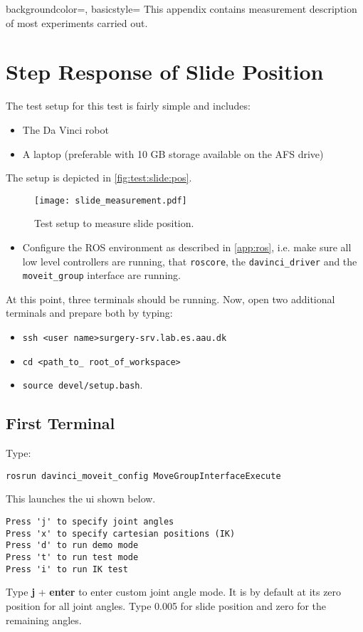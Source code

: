 {
    backgroundcolor=\color{black},
    basicstyle=\scriptsize\color{green}\ttfamily
}
This appendix contains measurement description of most experiments carried out.
\section{Step Response of Slide Position}
The test setup for this test is fairly simple and includes:
\begin{itemize}
\item The Da Vinci robot
\item A laptop (preferable with 10 GB storage available on the AFS drive)
\end{itemize}
The setup is depicted in \autoref{fig:test:slide:pos}.
\begin{figure}[H]\hspace{-1.4cm}
\texttt{[image: slide\_measurement.pdf]}
\caption{Test setup to measure slide position.}
\label{fig:test:slide:pos}
\end{figure}
\begin{itemize}
\item Configure the ROS environment as described in \autoref{app:ros}, i.e. make sure all low level controllers are running, that \texttt{roscore}, the \texttt{davinci\_driver} and the \texttt{moveit\_group} interface are running.
\end{itemize}
At this point, three terminals should be running. Now, open two additional terminals and prepare both by typing:
\begin{itemize}
\item \texttt{ssh <user name>surgery-srv.lab.es.aau.dk} 
\item \texttt{cd <path\_to\_ root\_of\_workspace>}
\item \texttt{source devel/setup.bash}.
\end{itemize}
\subsection*{First Terminal}
Type:

\hspace{1cm} \texttt{rosrun davinci\_moveit\_config MoveGroupInterfaceExecute}

This launches the \gls{ui} shown below.
\begin{lstlisting}[style=DOS]
Press 'j' to specify joint angles
Press 'x' to specify cartesian positions (IK)
Press 'd' to run demo mode
Press 't' to run test mode
Press 'i' to run IK test 
\end{lstlisting}
Type \textbf{j} + \textbf{enter} to enter custom joint angle mode. It is by default at its zero position for all joint angles. Type 0.005 for slide position and zero for the remaining angles.
